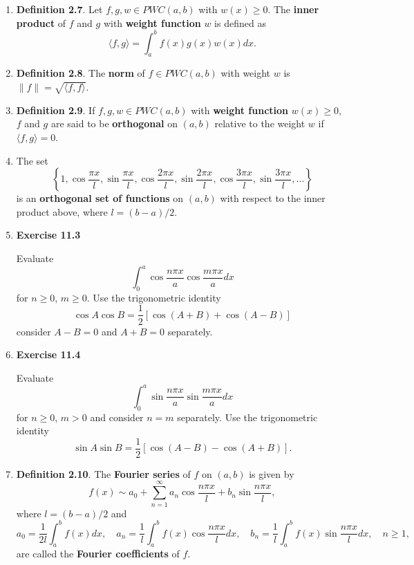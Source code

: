 \begin{enumerate}
\item \textbf{Definition 2.7}. Let $f, g, w \in PWC(a, b)$ with $w(x) \geq 0$. The \textbf{inner product}
of $f$ and $g$ with \textbf{weight function} $w$ is defined as
\[\langle f,g \rangle = \int_{a}^{b}f(x)g(x)w(x)dx.\]


\item \textbf{Definition 2.8}. The \textbf{norm} of $f \in P W C(a, b)$ with weight $w$ is $\|f\|=\sqrt{\langle f,f \rangle}$.

\item \textbf{Definition 2.9}. If $f, g, w \in P W C(a, b)$ with \textbf{weight function} $w(x) \geq 0$, $f$ and $g$ are said to be \textbf{orthogonal} on $(a, b)$ relative to the weight $w$ if $\langle f, g\rangle =0$.




\item The set 
\[\left\{ 1, \cos \frac{\pi x}{l}, \sin\frac{\pi x}{l} , \cos\frac{2\pi x}{l} , \sin\frac{2\pi x}{l} , \cos\frac{3\pi x}{l}, \sin\frac{3\pi x}{l} , \dots \right\} \]
is an \textbf{orthogonal set of functions} on $(a, b)$ with respect to the inner product above, where $l=(b-a)/2$.




\newpage 

\item \textbf{Exercise 11.3} 

Evaluate
\[\int_{0}^{a}\cos\frac{n\pi x}{a}\cos\frac{m\pi x}{a}dx\]
for $n \geq 0 $, $m \geq 0$. Use the trigonometric identity
\[\cos A \cos B = \frac{1}{2}[\cos(A+B) + \cos(A-B)]\]
consider $A-B=0$ and $A+B=0$ separately.

\vspace{340pt}

\item \textbf{Exercise 11.4}

Evaluate
\[\int_{0}^{a}\sin\frac{n\pi x}{a}\sin\frac{m\pi x}{a}dx\]
for $n \geq 0 $, $m> 0$ and consider $n=m$ separately. Use the trigonometric identity
\[\sin A \sin B = \frac{1}{2}[\cos(A-B) - \cos(A+B)].\]



\newpage

\item \textbf{Definition 2.10}.  The \textbf{Fourier series}  of $f$ on $(a, b)$ is given by
\[f(x) \sim a_{0}+\sum_{n=1}^{\infty}a_{n}\cos \frac{n\pi x}{l} + b_{n}\sin \frac{n\pi x}{l},\]
where $l=(b-a)/2$ and
\[a_{0} = \frac{1}{2l}\int_{a}^{b}f(x)dx, \quad a_{n} = \frac{1}{l}\int_{a}^{b}f(x)\cos\frac{n\pi x}{l}dx,\quad b_{n} = \frac{1}{l}\int_{a}^{b}f(x)\sin\frac{n\pi x}{l}dx,\quad n\geq 1,\]
are called the \textbf{Fourier coefficients} of $f$.


\end{enumerate}
